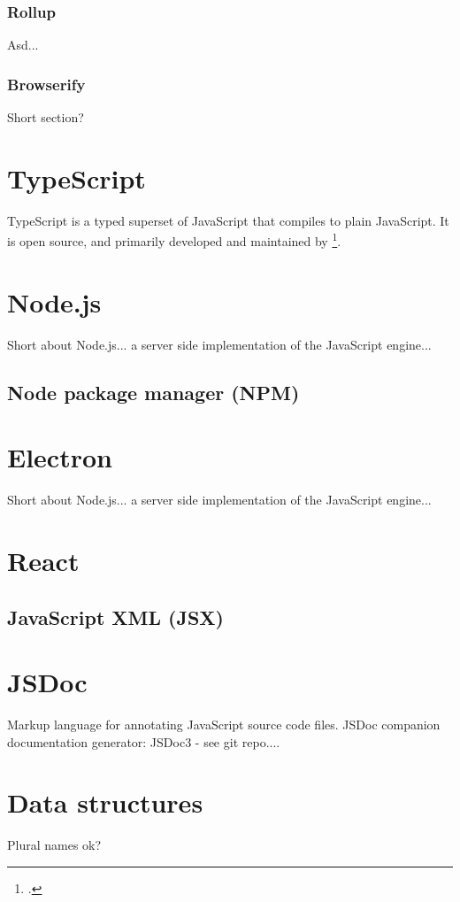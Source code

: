 \subsubsection{Rollup}
Asd...
\subsubsection{Browserify}
Short section?

\section{TypeScript}
TypeScript is a typed superset of JavaScript that compiles to plain JavaScript. It is open source, and primarily developed and maintained by \footcite{microsoft}.

\section{Node.js}
Short about Node.js... a server side implementation of the JavaScript engine... 
\subsection{Node package manager (NPM)}

\section{Electron}
Short about Node.js... a server side implementation of the JavaScript engine... 

\section{React}
\subsection{JavaScript XML (JSX)}

\section{JSDoc}
Markup language for annotating JavaScript source code files.
JSDoc companion documentation generator: JSDoc3 - see git repo....

\section{Data structures}
Plural names ok?

